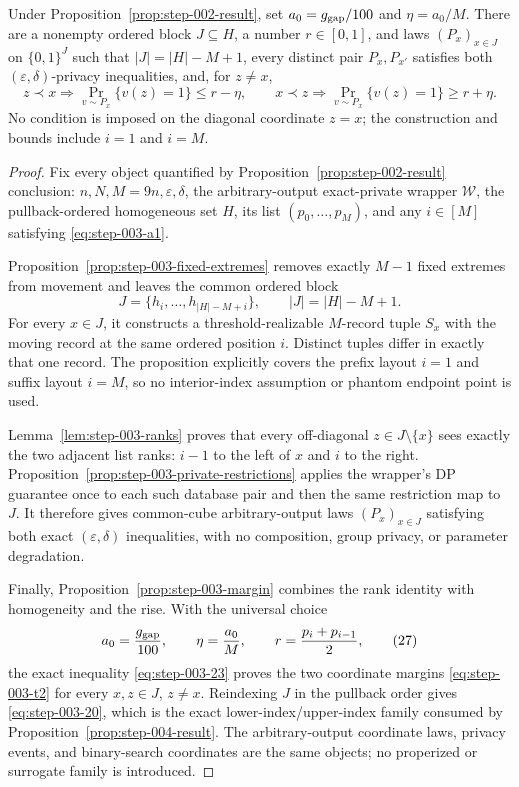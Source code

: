 \begin{proposition}
\label{prop:step-003-result}
Under Proposition~\ref{prop:step-002-result}, set
$a_0=g_{\rm gap}/100$ and $\eta=a_0/M$.  There are a nonempty ordered
block $J\subseteq H$, a number $r\in[0,1]$, and laws
$(P_x)_{x\in J}$ on $\{0,1\}^J$ such that
$|J|=|H|-M+1$, every distinct pair $P_x,P_{x'}$ satisfies both
$(\varepsilon,\delta)$-privacy inequalities, and, for $z\neq x$,
\[
z\prec x\Longrightarrow\Pr_{v\sim P_x}\{v(z)=1\}\leq r-\eta,
\qquad
x\prec z\Longrightarrow\Pr_{v\sim P_x}\{v(z)=1\}\geq r+\eta.
\]
No condition is imposed on the diagonal coordinate $z=x$; the
construction and bounds include $i=1$ and $i=M$.
\end{proposition}
\begin{proof}

Fix every object quantified by Proposition~\ref{prop:step-002-result} conclusion: \(n,N,M=9n,\varepsilon,\delta\), the arbitrary-output exact-private wrapper \(\mathcal W\), the pullback-ordered homogeneous set \(H\), its list \((p_0,\ldots,p_M)\), and any \(i \in [M]\) satisfying \eqref{eq:step-003-a1}.

Proposition~\ref{prop:step-003-fixed-extremes} removes exactly \(M-1\) fixed extremes from movement and leaves the common ordered block
\[
J=\{h_i,\ldots,h_{|H|-M+i}\},
\qquad
|J|=|H|-M+1.
\tag{26}\label{eq:step-003-26}
\]
For every \(x \in J\), it constructs a threshold-realizable \(M\)-record tuple \(S_x\) with the moving record at the same ordered position \(i\). Distinct tuples differ in exactly that one record. The proposition explicitly covers the prefix layout \(i=1\) and suffix layout \(i=M\), so no interior-index assumption or phantom endpoint point is used.

Lemma~\ref{lem:step-003-ranks} proves that every off-diagonal \(z \in J\setminus\{x\}\) sees exactly the two adjacent list ranks: \(i-1\) to the left of \(x\) and \(i\) to the right. Proposition~\ref{prop:step-003-private-restrictions} applies the wrapper's DP guarantee once to each such database pair and then the same restriction map to \(J\). It therefore gives common-cube arbitrary-output laws \((P_x)_{x\in J}\) satisfying both exact \((\varepsilon,\delta)\) inequalities, with no composition, group privacy, or parameter degradation.

Finally, Proposition~\ref{prop:step-003-margin} combines the rank identity with homogeneity and the rise. With the universal choice
\[
a_0=\frac{g_{\rm gap}}{100},
\qquad
\eta=\frac{a_0}{M},
\qquad
r=\frac{p_i+p_{i-1}}2,
\tag{27}\label{eq:step-003-27}
\]
the exact inequality \eqref{eq:step-003-23} proves the two coordinate margins \eqref{eq:step-003-t2} for every \(x,z \in J\), \(z \ne  x\). Reindexing \(J\) in the pullback order gives \eqref{eq:step-003-20}, which is the exact lower-index/upper-index family consumed by Proposition~\ref{prop:step-004-result}. The arbitrary-output coordinate laws, privacy events, and binary-search coordinates are the same objects; no properized or surrogate family is introduced.


\end{proof}
